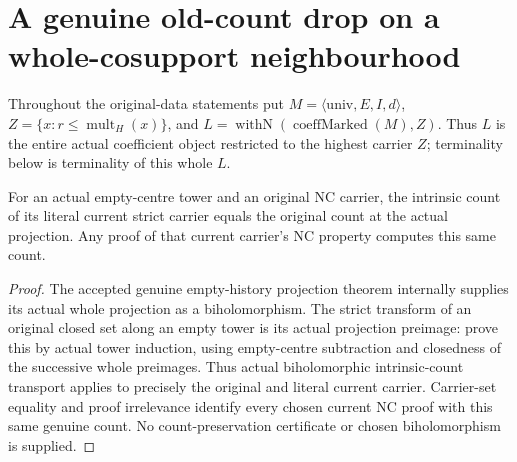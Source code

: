 \section{A genuine old-count drop on a whole-cosupport neighbourhood}
\label{sec:nc-permitted-count-drop}

Throughout the original-data statements put $M=\langle\mathrm{univ},E,I,d\rangle$,
$Z=\{x:r\le\operatorname{mult}_{H}(x)\}$, and
$L=\operatorname{withN}(\operatorname{coeffMarked}(M),Z)$.
Thus $L$ is the entire actual coefficient object restricted to the highest
carrier $Z$; terminality below is terminality of this whole $L$.

\begin{lemma}
\label{hir:nc-actual-empty-history-intrinsic-count}
\leanok
For an actual empty-centre tower and an original NC carrier, the intrinsic
count of its literal current strict carrier equals the original count at
the actual projection. Any proof of that current carrier's NC property
computes this same count.
\end{lemma}
\begin{proof}
The accepted genuine empty-history projection theorem internally supplies
its actual whole projection as a biholomorphism. The strict transform of an
original closed set along an empty tower is its actual projection preimage:
prove this by actual tower induction, using empty-centre subtraction and
closedness of the successive whole preimages. Thus actual biholomorphic
intrinsic-count transport applies to precisely the original and literal
current carrier. Carrier-set equality and proof irrelevance identify every
chosen current NC proof with this same genuine count. No count-preservation
certificate or chosen biholomorphism is supplied.
\end{proof}

